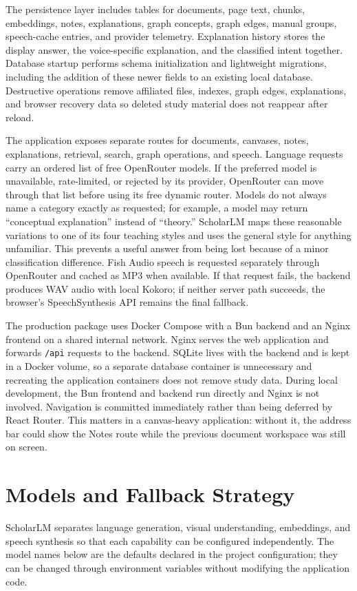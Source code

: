 \documentclass[conference]{IEEEtran}
\begin{document}
The persistence layer includes tables for documents, page text, chunks, embeddings, notes, explanations, graph concepts, graph edges, manual groups, speech-cache entries, and provider telemetry. Explanation history stores the display answer, the voice-specific explanation, and the classified intent together. Database startup performs schema initialization and lightweight migrations, including the addition of these newer fields to an existing local database. Destructive operations remove affiliated files, indexes, graph edges, explanations, and browser recovery data so deleted study material does not reappear after reload.

The application exposes separate routes for documents, canvases, notes, explanations, retrieval, search, graph operations, and speech. Language requests carry an ordered list of free OpenRouter models. If the preferred model is unavailable, rate-limited, or rejected by its provider, OpenRouter can move through that list before using its free dynamic router. Models do not always name a category exactly as requested; for example, a model may return ``conceptual explanation'' instead of ``theory.'' ScholarLM maps these reasonable variations to one of its four teaching styles and uses the general style for anything unfamiliar. This prevents a useful answer from being lost because of a minor classification difference. Fish Audio speech is requested separately through OpenRouter and cached as MP3 when available. If that request fails, the backend produces WAV audio with local Kokoro; if neither server path succeeds, the browser's SpeechSynthesis API remains the final fallback.

The production package uses Docker Compose with a Bun backend and an Nginx frontend on a shared internal network. Nginx serves the web application and forwards \texttt{/api} requests to the backend. SQLite lives with the backend and is kept in a Docker volume, so a separate database container is unnecessary and recreating the application containers does not remove study data. During local development, the Bun frontend and backend run directly and Nginx is not involved. Navigation is committed immediately rather than being deferred by React Router. This matters in a canvas-heavy application: without it, the address bar could show the Notes route while the previous document workspace was still on screen.

\section{Models and Fallback Strategy}
ScholarLM separates language generation, visual understanding, embeddings, and speech synthesis so that each capability can be configured independently. The model names below are the defaults declared in the project configuration; they can be changed through environment variables without modifying the application code.
\end{document}
